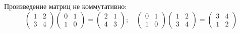     Произведение матриц не коммутативно: $$
    \begin{pmatrix}
        1 & 2\\
        3 & 4
    \end{pmatrix}
    \begin{pmatrix}
        0 & 1\\
        1 & 0
    \end{pmatrix}=
    \begin{pmatrix}
        2 & 1\\
        4 & 3
    \end{pmatrix};\quad
    \begin{pmatrix}
        0 & 1\\
        1 & 0
    \end{pmatrix}
    \begin{pmatrix}
        1 & 2\\
        3 & 4
    \end{pmatrix}=
    \begin{pmatrix}
        3 & 4\\
        1 & 2
    \end{pmatrix} $$

